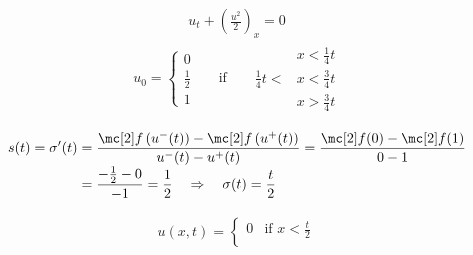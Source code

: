 \begin{examplebox}\nospacing
    \begin{example}\label{example:rk_for_riemann_problem_rarefaction_two}
        \begin{minipage}{0.4\textwidth}
            \begin{align}
            u_{t}+\left(\frac{u^{2}}{2}\right)_{x}=0
            \end{align}
            \begin{align}
            u_{0}=\left\{\begin{aligned}
                    0\\
                    \frac{1}{2}\\
                    1
                    \end{aligned}\right.&&\text{if}&&
                    \begin{aligned}
                    &x<\frac{1}{4}t\\
                    \frac{1}{4}t <&x<\frac{3}{4}t\\
                    &x>\frac{3}{4}t
                    \end{aligned}
            \label{eq:riemann_problem}
            \end{align}
        \end{minipage}\hfil
        \begin{minipage}[c]{0.4\textwidth}
            \begin{figure}[H]
                \centering{
                  \def\svgwidth{100pt}
                  \resizebox{\linewidth}{!}{}
                }
            \end{figure}
        \end{minipage}
        \begin{align*}
          s(t)=\sigma'(t)&=\frac{\flux \left(u^{-}(t)\right)-\flux \left(u^{+}(t)\right)}{
          u^{-}(t)-u^{+}(t)
          }=\frac{\flux(0)-\flux(1)}{0-1}\\[-1\jot]
          &=\frac{-\frac{1}{2}-0}{-1}=\frac{1}{2}\quad\Rightarrow\quad\sigma(t)=\frac{t}{2}
        \end{align*}
        \begin{minipage}[c]{0.55\textwidth}
            \begin{align}
            u(x,t)=\begin{cases}
                    0&\text{if }x<\frac{t}{2}\\

\end{cases}
\end{align}
\end{minipage}
\end{example}
\end{examplebox}

